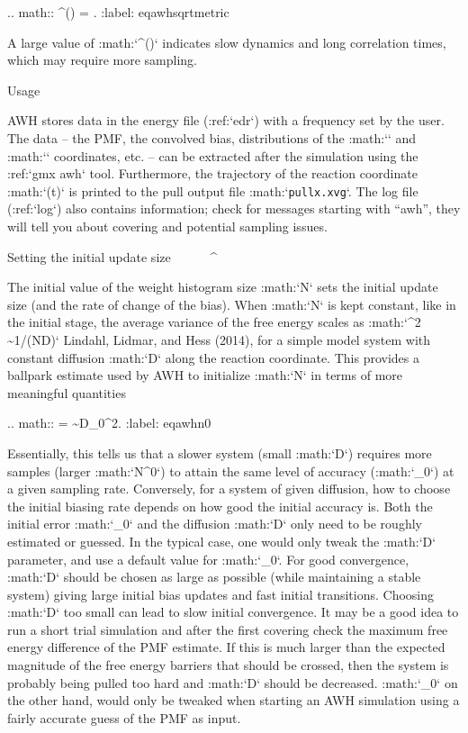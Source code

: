 .. math:: \eta^{}(\lambda) = \sqrt{\det\eta_{\mu\nu}(\lambda)}.
          :label: eqawhsqrtmetric

A large value of :math:`\eta^{}(\lambda)` indicates slow
dynamics and long correlation times, which may require more sampling.

Usage
~~~~~

AWH stores data in the energy file (:ref:`edr`) with a frequency set by the
user. The data – the PMF, the convolved bias, distributions of the
:math:`\lambda` and :math:`\xi` coordinates, etc. – can be extracted
after the simulation using the :ref:`gmx awh` tool. Furthermore, the trajectory
of the reaction coordinate :math:`\xi(t)` is printed to the pull output
file :math:`{\tt pullx.xvg}`. The log file (:ref:`log`) also contains
information; check for messages starting with “awh”, they will tell you
about covering and potential sampling issues.

Setting the initial update size
^^^^^^^^^^^^^^^^^^^^^^^^^^^^^^^

The initial value of the weight histogram size :math:`N` sets the
initial update size (and the rate of change of the bias). When :math:`N`
is kept constant, like in the initial stage, the average variance of the
free energy scales as :math:`\varepsilon^2 \sim 1/(ND)` Lindahl, Lidmar,
and Hess (2014), for a simple model system with constant diffusion
:math:`D` along the reaction coordinate. This provides a ballpark
estimate used by AWH to initialize :math:`N` in terms of more meaningful
quantities

.. math::  =  \sim D\varepsilon_0^2.
          :label: eqawhn0

Essentially, this tells us that a slower system (small :math:`D`)
requires more samples (larger :math:`N^0`) to attain the same level of
accuracy (:math:`\varepsilon_0`) at a given sampling rate. Conversely,
for a system of given diffusion, how to choose the initial biasing rate
depends on how good the initial accuracy is. Both the initial error
:math:`\varepsilon_0` and the diffusion :math:`D` only need to be
roughly estimated or guessed. In the typical case, one would only tweak
the :math:`D` parameter, and use a default value for
:math:`\varepsilon_0`. For good convergence, :math:`D` should be chosen
as large as possible (while maintaining a stable system) giving large
initial bias updates and fast initial transitions. Choosing :math:`D`
too small can lead to slow initial convergence. It may be a good idea to
run a short trial simulation and after the first covering check the
maximum free energy difference of the PMF estimate. If this is much
larger than the expected magnitude of the free energy barriers that
should be crossed, then the system is probably being pulled too hard and
:math:`D` should be decreased. :math:`\varepsilon_0` on the other hand,
would only be tweaked when starting an AWH simulation using a fairly
accurate guess of the PMF as input.

